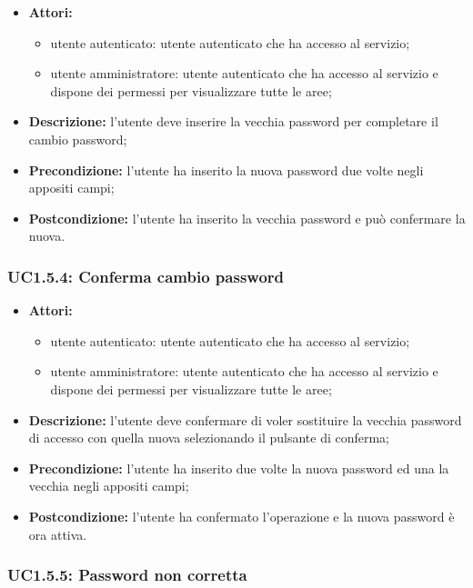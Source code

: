 \begin{itemize}
    	\item \textbf{Attori:}
    \begin{itemize}
    	\item utente autenticato: utente autenticato che ha accesso al servizio;
    	\item utente amministratore: utente autenticato che ha accesso al servizio e dispone dei permessi per visualizzare tutte le aree;
	\end{itemize}
    \item \textbf{Descrizione:} l'utente deve inserire la vecchia password per completare il cambio password;
    \item \textbf{Precondizione:} l'utente ha inserito la nuova password due volte negli appositi campi;
    \item \textbf{Postcondizione:} l'utente ha inserito la vecchia password e può confermare la nuova.
\end{itemize}

\subsubsection{UC1.5.4: Conferma cambio password}

\begin{itemize}
   	\item \textbf{Attori:}
    \begin{itemize}
    	\item utente autenticato: utente autenticato che ha accesso al servizio;
    	\item utente amministratore: utente autenticato che ha accesso al servizio e dispone dei permessi per visualizzare tutte le aree;
	\end{itemize}
    \item \textbf{Descrizione:} l'utente deve confermare di voler sostituire la vecchia password di accesso con quella nuova selezionando il pulsante di conferma;
    \item \textbf{Precondizione:} l'utente ha inserito due volte la nuova password ed una la vecchia negli appositi campi;
    \item \textbf{Postcondizione:} l'utente ha confermato l'operazione e la nuova password è ora attiva.
\end{itemize}

\subsubsection{UC1.5.5: Password non corretta}

